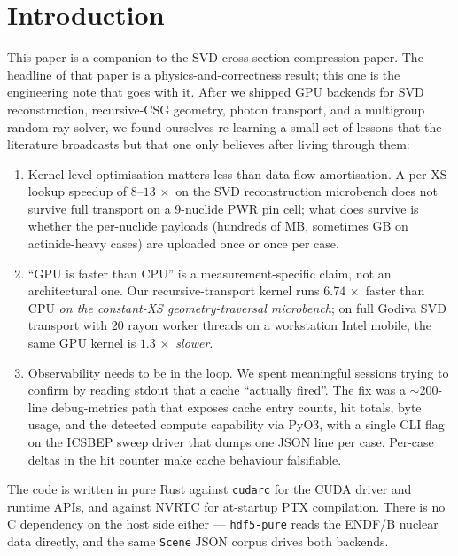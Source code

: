 \section{Introduction}
\label{sec:intro}

This paper is a companion to the SVD cross-section compression paper.
The headline of that paper is a physics-and-correctness result; this
one is the engineering note that goes with it. After we shipped GPU
backends for SVD reconstruction, recursive-CSG geometry, photon
transport, and a multigroup random-ray solver, we found ourselves
re-learning a small set of lessons that the literature broadcasts but
that one only believes after living through them:

\begin{enumerate}
    \item Kernel-level optimisation matters less than data-flow
        amortisation. A per-XS-lookup speedup of $8$--$13\,\times$ on
        the SVD reconstruction microbench does not survive full
        transport on a 9-nuclide PWR pin cell; what does survive is
        whether the per-nuclide payloads (hundreds of MB, sometimes
        GB on actinide-heavy cases) are uploaded once or once per
        case.
    \item ``GPU is faster than CPU'' is a measurement-specific claim,
        not an architectural one. Our recursive-transport kernel
        runs $6.74\,\times$ faster than CPU \emph{on the constant-XS
        geometry-traversal microbench}; on full Godiva SVD transport
        with 20 rayon worker threads on a workstation Intel mobile,
        the same GPU kernel is $1.3\,\times$ \emph{slower}.
    \item Observability needs to be in the loop. We spent meaningful
        sessions trying to confirm by reading stdout that a cache
        ``actually fired''. The fix was a $\sim$200-line debug-metrics
        path that exposes cache entry counts, hit totals, byte
        usage, and the detected compute capability via PyO3, with a
        single CLI flag on the ICSBEP sweep driver that dumps one
        JSON line per case. Per-case deltas in the hit counter make
        cache behaviour falsifiable.
\end{enumerate}

The code is written in pure Rust against \texttt{cudarc} for the
CUDA driver and runtime APIs, and against NVRTC for at-startup
PTX compilation. There is no C dependency on the host side
either --- \texttt{hdf5-pure} reads the ENDF/B nuclear data
directly, and the same \texttt{Scene} JSON corpus drives both
backends.

